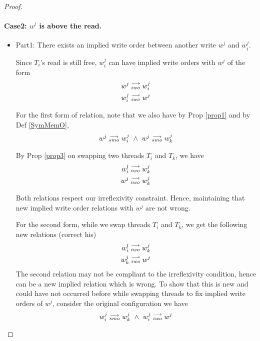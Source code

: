 \begin{proof}
            
            \paragraph{Case2: $w^l$ is above the read.}
                
                \begin{itemize}
                    \item Part1: There exists an implied write order between another write $w^j$ and $w_i^j$.

                Since $T_i$'s read is still free, $w_i^j$ can have implied write orders with $w^j$ of the form
                \begin{align*}
                    w^j\stackrel{\longrightarrow}{_{iwo}}w_i^j \\
                    w_i^j\stackrel{\longrightarrow}{_{iwo}}w^j 
                \end{align*}

                For the first form of relation, note that we also have by Prop \ref{prop1} and by Def \ref{SymMemO}, 
                \begin{align*}
                    \reln{w^j}{smo}{w_i^j} \ \wedge \ \reln{w^j}{smo}{w_k^j}
                \end{align*}

                By Prop \ref{prop3} on swapping two threads $T_i$ and $T_k$, we have 
                \begin{align*}
                    w_i^l\stackrel{\longrightarrow}{_{iwo}}w_k^j \\
                    w^j\stackrel{\longrightarrow}{_{iwo}}w_k^j
                \end{align*}

                Both relations respect our irreflexivity constraint.  Hence, maintaining that new implied write order relations with $w^j$ are not wrong.

                For the second form, while we swap threads $T_i$ and $T_k$, we get the following new relations (correct his)
                \begin{align*}
                    w_i^l\stackrel{\longrightarrow}{_{iwo}}w_k^j \\
                    w_k^j\stackrel{\longrightarrow}{_{iwo}}w^j
                \end{align*}
                The second relation may not be compliant to the irreflexivity condition, hence can be a new implied relation which is wrong. To show that this is new and could have not occurred before while swapping threads to fix implied write orders of $w^j$, consider the original configuration we have 
                \begin{align*}
                    \reln{w_i^j}{smo}{w_k^j} \ \wedge \ \reln{w_i^j}{iwo}{w^j}
                \end{align*}


\end{itemize}
\end{proof}
